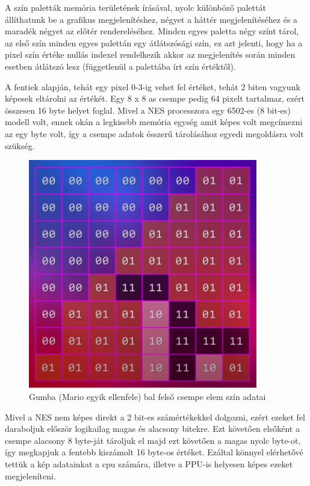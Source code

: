 	A szín paletták memória területének írásával, nyolc különböző palettát állíthatunk be a grafikus megjelenítéshez, négyet a háttér megjelenítéséhez és a maradék négyet az előtér rendereléséhez. Minden egyes paletta négy színt tárol, az első szín minden egyes palettán egy átlátszósági szín, ez azt jelenti, hogy ha a pixel szín értéke nullás indexel rendelkezik akkor az megjelenítés során minden esetben átlátszó lesz (függetlenül a palettába írt szín értéktől).
	
	A fentiek alapján, tehát egy pixel 0-3-ig vehet fel értéket, tehát 2 biten vagyunk képesek eltárolni az értékét. Egy 8 x 8 as csempe pedig 64 pixelt tartalmaz, ezért összesen 16 byte helyet foglal. Mivel a NES processzora egy 6502-es (8 bit-es) modell volt, ennek okán a legkisebb memória egység amit képes volt megcímezni az egy byte volt, így a csempe adatok ésszerű tárolásához egyedi megoldásra volt szükség.
	
	\begin{figure}[H]
		\centering
		\includegraphics[width=100mm, keepaspectratio]{figures/Gumba-tile}
		\caption{Gumba (Mario egyik ellenfele) bal felső csempe elem szín adatai}
		\label{fig:Gumba-tile}
	\end{figure}

	Mivel a NES nem képes direkt a 2 bit-es számértékekkel dolgozni, ezért ezeket fel daraboljuk először logikailag magas és alacsony bitekre. Ezt követően elsőként a csempe alacsony 8 byte-ját tároljuk el majd ezt követően a magas nyolc byte-ot, így megkapjuk a fentebb kiszámolt 16 byte-os értéket. Ezáltal könnyel elérhetővé tettük a kép adatainkat a cpu számára, illetve a PPU-is helyesen képes ezeket megjeleníteni.
	
